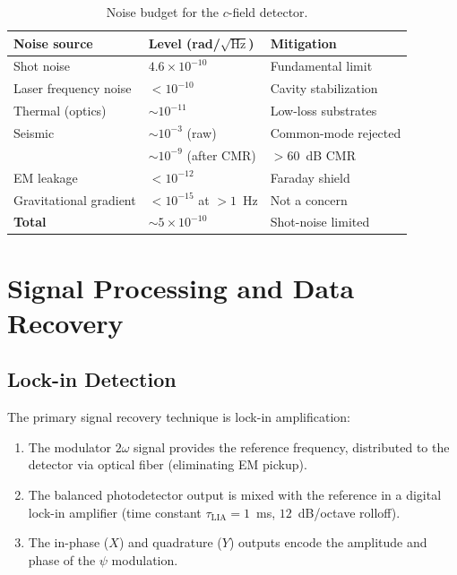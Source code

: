 \documentclass[11pt,letterpaper]{article}
\newcommand{\ee}[1]{\times 10^{#1}}
\newcommand{\psifield}{\psi}
\begin{document}
\begin{table}[H]
\centering
\caption{Noise budget for the $c$-field detector.}
\label{tab:noise_budget}
\begin{tabular}{@{}lll@{}}
\toprule
Noise source & Level (rad/$\sqrt{\text{Hz}}$) & Mitigation \\
\midrule
Shot noise & $4.6\ee{-10}$ & Fundamental limit \\
Laser frequency noise & $< 10^{-10}$ & Cavity stabilization \\
Thermal (optics) & $\sim 10^{-11}$ & Low-loss substrates \\
Seismic & $\sim 10^{-3}$ (raw) & Common-mode rejected \\
& $\sim 10^{-9}$ (after CMR) & $>60$~dB CMR \\
EM leakage & $< 10^{-12}$ & Faraday shield \\
Gravitational gradient & $< 10^{-15}$ at $>1$~Hz & Not a concern \\
\midrule
\textbf{Total} & $\sim 5\ee{-10}$ & Shot-noise limited \\
\bottomrule
\end{tabular}
\end{table}

\section{Signal Processing and Data Recovery}
\label{sec:signal_processing}

\subsection{Lock-in Detection}

The primary signal recovery technique is lock-in amplification:

\begin{enumerate}
\item The modulator $2\omega$ signal provides the reference
frequency, distributed to the detector via optical fiber
(eliminating EM pickup).

\item The balanced photodetector output is mixed with the reference
in a digital lock-in amplifier (time constant $\tau_\text{LIA} =
1$~ms, $12$~dB/octave rolloff).

\item The in-phase ($X$) and quadrature ($Y$) outputs encode the
amplitude and phase of the $\psifield$ modulation.
\end{enumerate}
\end{document}
